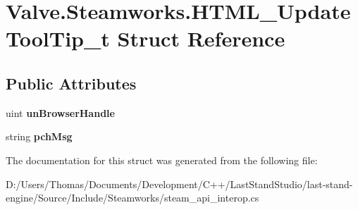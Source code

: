 \hypertarget{structValve_1_1Steamworks_1_1HTML__UpdateToolTip__t}{}\section{Valve.\+Steamworks.\+H\+T\+M\+L\+\_\+\+Update\+Tool\+Tip\+\_\+t Struct Reference}
\label{structValve_1_1Steamworks_1_1HTML__UpdateToolTip__t}
\subsection*{Public Attributes}
\begin{DoxyCompactItemize}
\item 
\hypertarget{structValve_1_1Steamworks_1_1HTML__UpdateToolTip__t_ade25a36919bff489ff86daefa4b35f29}{}uint {\bfseries un\+Browser\+Handle}\label{structValve_1_1Steamworks_1_1HTML__UpdateToolTip__t_ade25a36919bff489ff86daefa4b35f29}

\item 
\hypertarget{structValve_1_1Steamworks_1_1HTML__UpdateToolTip__t_a441515d93cb7cbcedb808cf204e6dd7d}{}string {\bfseries pch\+Msg}\label{structValve_1_1Steamworks_1_1HTML__UpdateToolTip__t_a441515d93cb7cbcedb808cf204e6dd7d}

\end{DoxyCompactItemize}


The documentation for this struct was generated from the following file\+:\begin{DoxyCompactItemize}
\item 
D\+:/\+Users/\+Thomas/\+Documents/\+Development/\+C++/\+Last\+Stand\+Studio/last-\/stand-\/engine/\+Source/\+Include/\+Steamworks/steam\+\_\+api\+\_\+interop.\+cs\end{DoxyCompactItemize}
